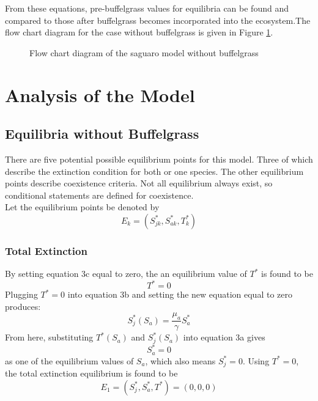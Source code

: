 \documentclass[a4paper]{article}
\begin{document}
From these equations, pre-buffelgrass values for equilibria can be found and compared to those after buffelgrass becomes incorporated into the ecosystem.The flow chart diagram for the case without buffelgrass is given in Figure \ref{fig:OriginalModel}.

\begin{figure}[H]

\caption{Flow chart diagram of the saguaro model without buffelgrass}
\label{fig:OriginalModel}
\end{figure}

\section{Analysis of the Model}
\subsection{Equilibria without Buffelgrass}
There are five potential possible equilibrium points for this model. Three of which describe the extinction condition for both or one species. The other equilibrium points describe coexistence criteria. Not all equilibrium always exist, so conditional statements are defined for coexistence.\\

Let the equilibrium points be denoted by \newline
$$E_k = (S_{jk}^*, S_{ak}^*, T_k^*)$$

\subsubsection{Total Extinction}
By setting equation 3c equal to zero, the an equilibrium value of $T^*$ is found to be 
\begin{equation*}
T^* = 0
\end{equation*}
Plugging $T^* = 0$ into equation 3b and setting the new equation equal to zero produces:
\begin{equation*}
S_j^*(S_a) = \displaystyle\frac{\mu_a}{\gamma} S_a^*
\end{equation*}
From here, substituting $T^*(S_a)$ and $S_j^*(S_a)$ into equation 3a gives 
\begin{equation*}
S_a^* = 0
\end{equation*}
as one of the equilibrium values of $S_a$, which also means $S_j^* = 0$. Using $T^*=0$, the total extinction equilibrium is found to be
$$E_1 = (S_j^* , S_a^* , T^*) =  (0 , 0 , 0)$$
\end{document}
